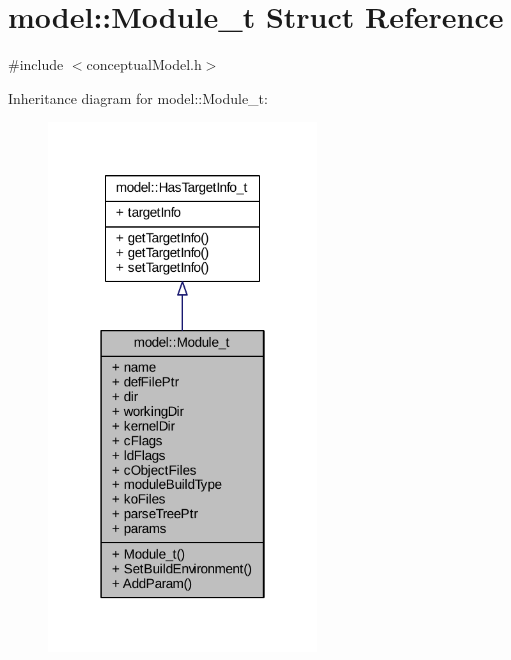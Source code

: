 \hypertarget{structmodel_1_1_module__t}{}\section{model\+:\+:Module\+\_\+t Struct Reference}
\label{structmodel_1_1_module__t}


{\ttfamily \#include $<$conceptual\+Model.\+h$>$}



Inheritance diagram for model\+:\+:Module\+\_\+t\+:
\nopagebreak
\begin{figure}[H]
\begin{center}
\leavevmode
\includegraphics[width=202pt]{structmodel_1_1_module__t__inherit__graph}
\end{center}
\end{figure}


